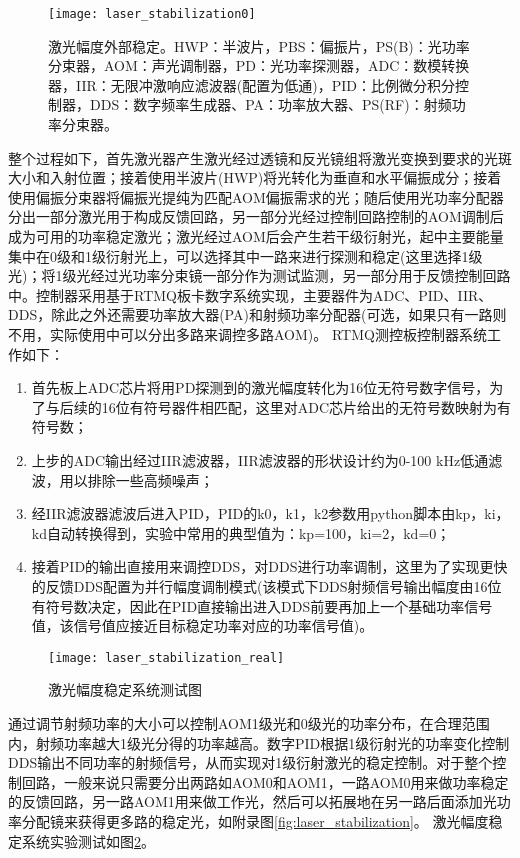 \begin{figure}
    \centering
    \texttt{[image: laser\_stabilization0]}
    \caption[激光幅度外部稳定]{激光幅度外部稳定。HWP：半波片，PBS：偏振片，PS(B)：光功率分束器，AOM：声光调制器，PD：光功率探测器，ADC：数模转换器，IIR：无限冲激响应滤波器(配置为低通)，PID：比例微分积分控制器，DDS：数字频率生成器、PA：功率放大器、PS(RF)：射频功率分束器。\label{fig:laser_stabilization0}}
\end{figure}

整个过程如下，首先激光器产生激光经过透镜和反光镜组将激光变换到要求的光斑大小和入射位置；接着使用半波片(HWP)将光转化为垂直和水平偏振成分；接着使用偏振分束器将偏振光提纯为匹配AOM偏振需求的光；随后使用光功率分配器分出一部分激光用于构成反馈回路，另一部分光经过控制回路控制的AOM调制后成为可用的功率稳定激光；激光经过AOM后会产生若干级衍射光，起中主要能量集中在0级和1级衍射光上，可以选择其中一路来进行探测和稳定(这里选择1级光)；将1级光经过光功率分束镜一部分作为测试监测，另一部分用于反馈控制回路中。控制器采用基于RTMQ板卡数字系统实现，主要器件为ADC、PID、IIR、DDS，除此之外还需要功率放大器(PA)和射频功率分配器(可选，如果只有一路则不用，实际使用中可以分出多路来调控多路AOM)。
RTMQ测控板控制器系统工作如下：
\begin{enumerate}
    \item 首先板上ADC芯片将用PD探测到的激光幅度转化为16位无符号数字信号，为了与后续的16位有符号器件相匹配，这里对ADC芯片给出的无符号数映射为有符号数；
    \item 上步的ADC输出经过IIR滤波器，IIR滤波器的形状设计约为0-100 kHz低通滤波，用以排除一些高频噪声；
    \item 经IIR滤波器滤波后进入PID，PID的k0，k1，k2参数用python脚本由kp，ki，kd自动转换得到，实验中常用的典型值为：kp=100，ki=2，kd=0；
    \item 接着PID的输出直接用来调控DDS，对DDS进行功率调制，这里为了实现更快的反馈DDS配置为并行幅度调制模式(该模式下DDS射频信号输出幅度由16位有符号数决定，因此在PID直接输出进入DDS前要再加上一个基础功率信号值，该信号值应接近目标稳定功率对应的功率信号值)。
\end{enumerate}

\begin{figure}
    \centering
    \texttt{[image: laser\_stabilization\_real]}
    \caption[激光幅度稳定系统测试图]{激光幅度稳定系统测试图\label{fig:laser_stabilization_real}}
\end{figure}

通过调节射频功率的大小可以控制AOM1级光和0级光的功率分布，在合理范围内，射频功率越大1级光分得的功率越高。数字PID根据1级衍射光的功率变化控制DDS输出不同功率的射频信号，从而实现对1级衍射激光的稳定控制。对于整个控制回路，一般来说只需要分出两路如AOM0和AOM1，一路AOM0用来做功率稳定的反馈回路，另一路AOM1用来做工作光，然后可以拓展地在另一路后面添加光功率分配镜来获得更多路的稳定光，如附录图\ref{fig:laser_stabilization}。
激光幅度稳定系统实验测试如图\ref{fig:laser_stabilization_real}。




